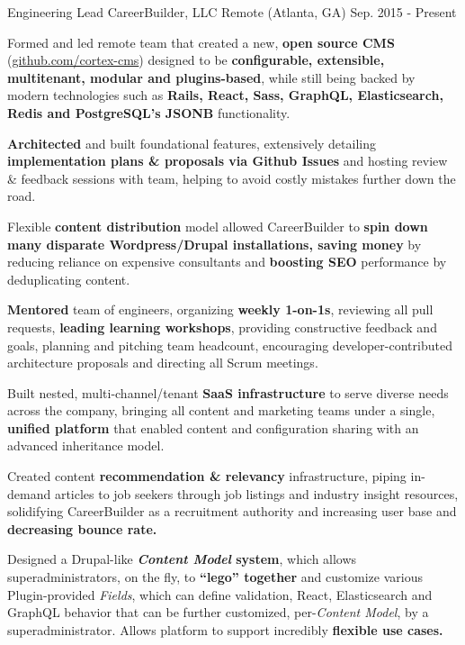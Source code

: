 \begin{cventries}
  \cventry
    {Engineering Lead}
    {CareerBuilder, LLC}
    {Remote (Atlanta, GA)}
    {Sep. 2015 - Present}
    {
      \begin{cvitems}
        \item {Formed and led remote team that created a new, \textbf{open source CMS} (\url{github.com/cortex-cms}) designed to be \textbf{configurable, extensible, multitenant, modular and plugins-based}, while still being backed by modern technologies such as \textbf{Rails, React, Sass, GraphQL, Elasticsearch, Redis and PostgreSQL's JSONB} functionality.}
        \item {\textbf{Architected} and built foundational features, extensively detailing \textbf{implementation plans \& proposals via Github Issues} and hosting review \& feedback sessions with team, helping to avoid costly mistakes further down the road.}
        \item {Flexible \textbf{content distribution} model allowed CareerBuilder to \textbf{spin down many disparate Wordpress/Drupal installations, saving money} by reducing reliance on expensive consultants and \textbf{boosting SEO} performance by deduplicating content.}
        \item {\textbf{Mentored} team of engineers, organizing \textbf{weekly 1-on-1s}, reviewing all pull requests, \textbf{leading learning workshops}, providing constructive feedback and goals, planning and pitching team headcount, encouraging developer-contributed architecture proposals and directing all Scrum meetings.}
        \item {Built nested, multi-channel/tenant \textbf{SaaS infrastructure }to serve diverse needs across the company, bringing all content and marketing teams under a single, \textbf{unified platform} that enabled content and configuration sharing with an advanced inheritance model.}
        \item {Created content \textbf{recommendation \& relevancy} infrastructure, piping in-demand articles to job seekers through job listings and industry insight resources, solidifying CareerBuilder as a recruitment authority and increasing user base and \textbf{decreasing bounce rate.}}
        \item {Designed a Drupal-like \textbf{\textit{Content Model} system}, which allows superadministrators, on the fly, to \textbf{“lego” together} and customize various Plugin-provided \textit{Fields}, which can define validation, React, Elasticsearch and GraphQL behavior that can be further customized, per-\textit{Content Model}, by a superadministrator. Allows platform to support incredibly \textbf{flexible use cases.}}

\end{cvitems}}
\end{cventries}
